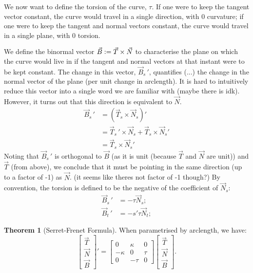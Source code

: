 \documentclass{article}
\newcommand{\vc}{\vcentcolon}
\theoremstyle{definition}
\newtheorem{thm}{Theorem}[subsubsection]
\begin{document}
We now want to define the torsion of the curve, $\tau$. If one were to keep the tangent vector constant, the curve would travel in a single direction, with 0 curvature; if one were to keep the tangent and normal vectors constant, the curve would travel in a single plane, with 0 torsion.\par

We define the binormal vector $\vec B\vc=\vec T\times\vec N$ to characterise the plane on which the curve would live in if the tangent and normal vectors at that instant were to be kept constant. The change in this vector, $\vec B_s\,'$, quantifies (...) the change in the normal vector of the plane (per unit change in arclength). It is hard to intuitively reduce this vector into a single word we are familiar with (maybe there is idk). However, it turns out that this direction is equivalent to $\vec N$.
\begin{align*}
	\vec B_s\,'&=(\vec T_s\times\vec N_s)'\\
	&=\vec T_s\,'\times\vec N_s+\vec T_s\times\vec N_s'\\
	&=\vec T_s\times\vec N_s'
\end{align*}
Noting that $\vec B_s\,'$ is orthogonal to $\vec B$ (as it is unit (because $\vec T$ and $\vec N$ are unit)) and $\vec T$ (from above), we conclude that it must be pointing in the same direction (up to a factor of -1) as $\vec N$. (it seems like theres not factor of -1 though?) By convention, the torsion is defined to be the negative of the coefficient of $\vec N_s$:
\begin{align*}
	\vec B_s\,'&=-\tau\vec N_s;\\
	\vec B_t\,'&=-s'\tau\vec N_t;
\end{align*}
\begin{thm}[Serret-Frenet Formula]
	When parametrised by arclength, we have:
	\[\begin{bmatrix}\vec T\\\vec N\\\vec B\end{bmatrix}'=\begin{bmatrix}0&\kappa&0\\-\kappa&0&\tau\\0&-\tau&0\end{bmatrix}\begin{bmatrix}\vec T\\\vec N\\\vec B\end{bmatrix}.\]
\end{thm}
\end{document}
